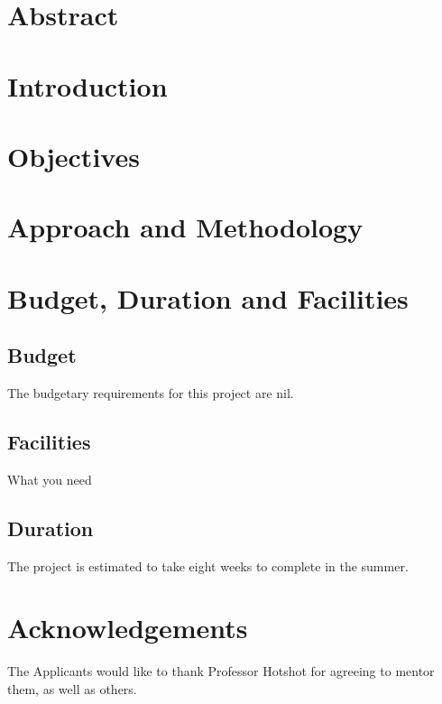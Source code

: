 \documentclass[12pt]{article}
\begin{document}
\setlength{\parskip}{1em}

\section*{Abstract}

\lipsum[1]

\section*{Introduction}

\lipsum[3]

\section*{Objectives}

\lipsum[1]

\section*{Approach and Methodology}

\lipsum[4]

\section*{Budget, Duration and Facilities}

\subsection*{Budget}
The budgetary requirements for this project are nil. %

\subsection*{Facilities}
What you need

\subsection*{Duration}
The project is estimated to take eight weeks to complete in the summer.

\section*{Acknowledgements}

The Applicants would like to thank Professor Hotshot for agreeing to mentor them, as well as others.



\end{document}
